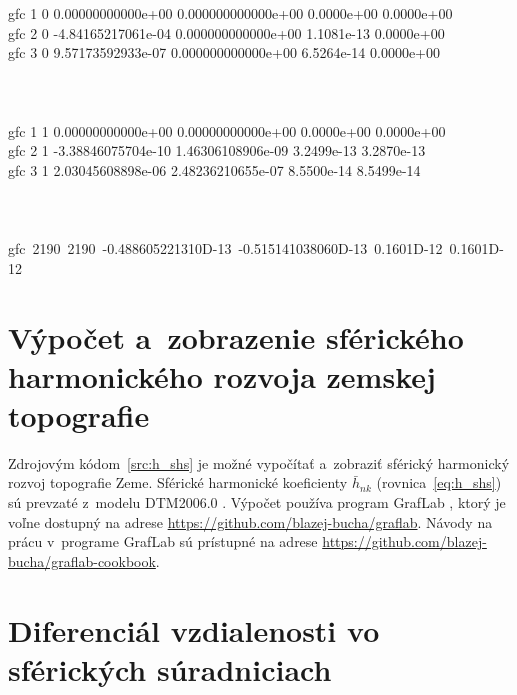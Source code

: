 \documentclass[a4paper, 12pt]{book}
\begin{document}
{\noindent gfc    1    0  \phantom{-}0.00000000000e+00 0.000000000000e+00 0.0000e+00 0.0000e+00\\
\noindent gfc    2    0 -4.84165217061e-04 0.000000000000e+00 1.1081e-13 0.0000e+00\\
\noindent gfc    3    0  \phantom{-}9.57173592933e-07 0.000000000000e+00 6.5264e-14 0.0000e+00\\
\\
\noindent [...]
\\
\\
\noindent gfc    1    1 \phantom{-}0.00000000000e+00 0.00000000000e+00 0.0000e+00 0.0000e+00\\
\noindent gfc    2    1 -3.38846075704e-10  1.46306108906e-09 3.2499e-13 3.2870e-13\\
\noindent gfc    3    1 \phantom{-}2.03045608898e-06  2.48236210655e-07 
8.5500e-14 8.5499e-14\\
\\
\noindent [...]
\\
\\
\noindent \mbox{gfc 2190 2190 -0.488605221310D-13 -0.515141038060D-13 0.1601D-12 0.1601D-12}
}

\normalsize





\chapter{Výpočet a~zobrazenie sférického harmonického rozvoja zemskej
topografie}
\label{app:shs_topography}

Zdrojovým kódom~\ref{src:h_shs} je možné vypočítať a~zobraziť sférický 
harmonický rozvoj topografie Zeme.  Sférické harmonické koeficienty 
$\bar{h}_{nk}$ (rovnica~\ref{eq:h_shs}) sú prevzaté z~modelu DTM2006.0 
\parencite{DTM2006}.  Výpočet používa program GrafLab \parencite{GrafLab}, 
ktorý je voľne dostupný na adrese 
\url{https://github.com/blazej-bucha/graflab}.  Návody na prácu v~programe 
GrafLab sú prístupné na adrese 
\url{https://github.com/blazej-bucha/graflab-cookbook}.








\chapter{Diferenciál vzdialenosti vo sférických súradniciach}
\label{app:differential_of_line_element_in_sph_coords}
\end{document}
